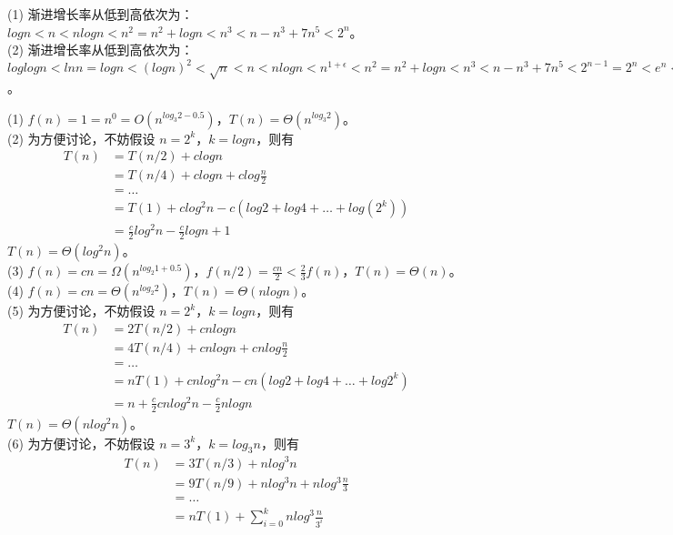 \documentclass[12pt, a4paper, oneside]{ctexart}
\begin{document}
\begin{solution}[2.8]
(1) 渐进增长率从低到高依次为：
\\$logn < n < nlogn < n^2 = n^2 + logn < n^3 < n - n^3 + 7n^5 < 2^n$。
\\(2) 渐进增长率从低到高依次为：
\\$loglogn < lnn = logn < (logn)^2 < \sqrt{n} < n < nlogn < n^{1 + \epsilon} < n^2 = n^2 + logn < n^3 < n - n^3 + 7n^5 < 2^{n - 1} = 2^n < e^n < n!$。
\end{solution}

\begin{solution}[2.16]
(1) $f(n) = 1 = n^0 = O(n^{log_3 2 - 0.5})$，$T(n) = \Theta(n^{log_3 2})$。
\\(2) 为方便讨论，不妨假设 $n = 2^k$，$k = logn$，则有
\begin{align*}
    T(n) &= T(n / 2) + clogn \\
    &= T(n / 4) + clog n + clog \frac{n}{2} \\
    &= \dots \\
    &= T(1) + clog^2 n - c(log2 + log4 + \dots + log(2^{k})) \\
    &= \frac{c}{2} log^2 n - \frac{c}{2} logn + 1
\end{align*}
$T(n) = \Theta(log^2 n)$。
\\(3) $f(n) = cn = \Omega(n^{log_2 1 + 0.5})$，$f(n / 2) = \frac{cn}{2} < \frac{2}{3} f(n)$，$T(n) = \Theta(n)$。
\\(4) $f(n) = cn = \Theta(n^{log_2 2})$，$T(n) = \Theta(nlogn)$。
\\(5) 为方便讨论，不妨假设 $n = 2^k$，$k = logn$，则有
\begin{align*}
    T(n) &= 2T(n / 2) + cnlogn \\
    &= 4T(n / 4) + cnlogn + cnlog \frac{n}{2} \\
    &= \dots \\
    &= nT(1) + cnlog^2 n - cn(log2 + log4 + \dots + log2^k) \\
    &= n + \frac{c}{2} cnlog^2 n - \frac{c}{2}nlogn
\end{align*}
$T(n) = \Theta(nlog^2 n)$。
\\(6) 为方便讨论，不妨假设 $n = 3^k$，$k = log_3 n$，则有
\begin{align*}
    T(n) &= 3T(n / 3) + nlog^3 n \\
    &=  9T(n / 9) + nlog^3 n + nlog^3 \frac{n}{3} \\
    &= \dots \\
    &= nT(1) + \sum_{i = 0}^{k} nlog^3 \frac{n}{3^i}
\end{align*}

\end{solution}
\end{document}

